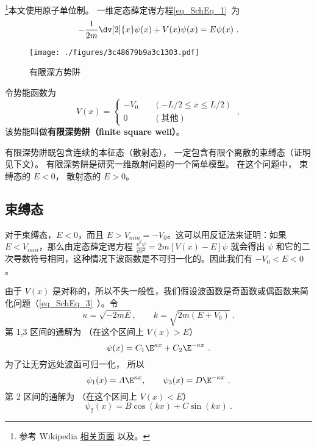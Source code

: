 
\begin{issues}
\issueTODO
\end{issues}




\footnote{参考 Wikipedia \href{https://en.wikipedia.org/wiki/Finite_potential_well}{相关页面} 以及\cite{GriffQ}。}本文使用原子单位制。 一维定态薛定谔方程\autoref{eq_SchEq_1}~为
\begin{equation}
-\frac{1}{2m}\dv[2]{x}\psi(x) + V(x) \psi(x) = E \psi(x)~.
\end{equation}

\begin{figure}[ht]
\centering
\texttt{[image: ./figures/3c48679b9a3c1303.pdf]}
\caption{有限深方势阱} \label{fig_FSW_1}
\end{figure}
令势能函数为
\begin{equation}
V(x) = \begin{cases}
-V_0 \quad &(-L/2 \leqslant x \leqslant L/2)\\
0 \quad &(\text{其他})
\end{cases}~,
\end{equation}
该势能叫做\textbf{有限深势阱（finite square well）}。

有限深势阱既包含连续的本征态（散射态）， 一定包含有限个离散的束缚态（证明见下文）。 有限深势阱是研究一维散射问题的一个简单模型。 在这个问题中， 束缚态的 $E<0$， 散射态的 $E>0$。

\subsection{束缚态}
对于束缚态，$E<0$，而且 $E> V_{min}=-V_0$。这可以用反证法来证明：如果 $E<V_{min}$，那么由定态薛定谔方程 $\frac{\dd {^2}\psi}{\dd x^2}=2m[V(x)-E]\psi$ 就会得出 $\psi$ 和它的二次导数符号相同，这种情况下波函数是不可归一化的。因此我们有 $-V_0<E<0$。

由于 $V(x)$ 是对称的，所以不失一般性，我们假设波函数是奇函数或偶函数来简化问题（\autoref{eq_SchEq_3}~）。令
\begin{equation}\label{eq_FSW_4}
\kappa = \sqrt{-2mE}, \qquad k = \sqrt{2m(E + V_0)}~.
\end{equation}
第 1,3 区间的通解为 （在这个区间上 $V(x) > E$）
\begin{equation}
\psi(x) = C_1 \E^{\kappa x} + C_2 \E^{-\kappa x}~.
\end{equation}
为了让无穷远处波函可归一化， 所以
\begin{equation}
\psi_1(x) = A \E^{\kappa x}, \qquad \psi_3(x) = D\E^{-\kappa x}~.
\end{equation}
第 2 区间的通解为 （在这个区间上 $V(x) < E$）
\begin{equation}
\psi_2(x) = B \cos(k x) + C\sin(k x)~.
\end{equation}

